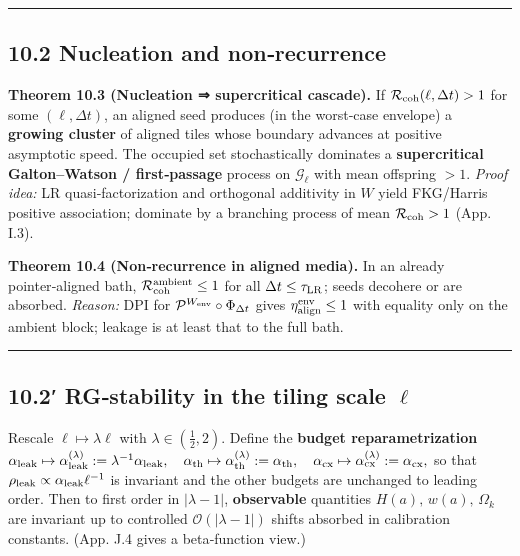 \documentclass[
]{article}
\numberwithin{equation}{section}
\begin{document}
\begin{center}\rule{0.5\linewidth}{0.5pt}\end{center}

\hypertarget{nucleation-and-nonrecurrence}{%
\subsection{10.2 Nucleation and
non‑recurrence}\label{nucleation-and-nonrecurrence}}

\textbf{Theorem 10.3 (Nucleation ⇒ supercritical cascade).} If
\(\mathcal R_{\rm coh}(\ell,\Delta t)>1\) for some \((\ell,\Delta t)\),
an aligned seed produces (in the worst‑case envelope) a \textbf{growing
cluster} of aligned tiles whose boundary advances at positive asymptotic
speed. The occupied set stochastically dominates a \textbf{supercritical
Galton--Watson / first‑passage} process on \(\mathcal G_\ell\) with mean
offspring \(>1\). \emph{Proof idea:} LR quasi‑factorization and
orthogonal additivity in \(W\) yield FKG/Harris positive association;
dominate by a branching process of mean \(\mathcal R_{\rm coh}>1\) (App.
I.3).

\textbf{Theorem 10.4 (Non‑recurrence in aligned media).} In an already
pointer‑aligned bath, \(\mathcal R_{\rm coh}^{\rm ambient}\le1\) for all
\(\Delta t\le\tau_{\rm LR}\); seeds decohere or are absorbed.
\emph{Reason:} DPI for \(\mathcal P^{W_{\rm env}}\circ\Phi_{\Delta t}\)
gives \(\eta_{\rm align}^{\rm env}\le1\) with equality only on the
ambient block; leakage is at least that to the full bath.

\begin{center}\rule{0.5\linewidth}{0.5pt}\end{center}

\hypertarget{rgstability-in-the-tiling-scale-ell}{%
\subsection{\texorpdfstring{10.2′ RG‑stability in the tiling scale
\(\ell\)}{10.2′ RG‑stability in the tiling scale \textbackslash ell}}\label{rgstability-in-the-tiling-scale-ell}}

Rescale \(\ell\mapsto\lambda\ell\) with \(\lambda\in(\tfrac12,2)\).
Define the \textbf{budget reparametrization}
\(\alpha_{\rm leak}\mapsto \alpha_{\rm leak}^{(\lambda)}:=\lambda^{-1}\alpha_{\rm leak},\quad \alpha_{\rm th}\mapsto\alpha_{\rm th}^{(\lambda)}:=\alpha_{\rm th},\quad \alpha_{\rm cx}\mapsto\alpha_{\rm cx}^{(\lambda)}:=\alpha_{\rm cx},\)
so that \(\rho_{\rm leak}\propto \alpha_{\rm leak}\ell^{-1}\) is
invariant and the other budgets are unchanged to leading order. Then to
first order in \(|\lambda-1|\), \textbf{observable} quantities
\(H(a),\,w(a),\,\Omega_k\) are invariant up to controlled
\(\mathcal O(|\lambda-1|)\) shifts absorbed in calibration constants.
(App. J.4 gives a beta‑function view.)
\end{document}
